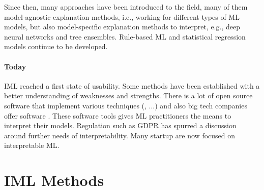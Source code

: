 \documentclass[runningheads]{llncs}
\begin{document}
Since then, many approaches have been introduced to the field, many of them model-agnostic explanation methods, i.e., working for different types of ML models, but also model-specific explanation methods to interpret, e.g., deep neural networks and tree ensembles.
Rule-based ML and statistical regression models continue to be developed.


\paragraph{Today} IML reached a first state of usability.
Some methods have been established with a better understanding of weaknesses and strengths.
There is a lot of open source software that implement various techniques (\cite{iml,biecek2018dalex,pedregosa2011scikit,klaise2020alibi,nori2019interpretml}, ...) and also big tech companies offer software \cite{exler2019if,arya2020ai,hall2017machine}.
These software tools gives ML practitioners the means to interpret their models.
Regulation such as GDPR has spurred a discussion around further needs of interpretability.
Many startup are now focused on interpretable ML.


\section*{IML Methods}
\end{document}
